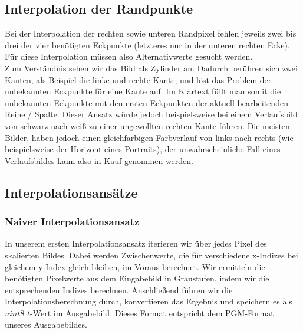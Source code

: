 \documentclass[course=erap]{aspdoc}
\begin{document}
\subsection{Interpolation der Randpunkte}
Bei der Interpolation der rechten sowie unteren Randpixel fehlen jeweils zwei bis drei der vier benötigten Eckpunkte (letzteres nur in der unteren rechten Ecke). Für diese Interpolation müssen also Alternativwerte gesucht werden.\\
Zum Verständnis sehen wir das Bild als Zylinder an. Dadurch berühren sich zwei Kanten, als Beispiel die linke und rechte Kante, und löst das Problem der unbekannten Eckpunkte für eine Kante auf. Im Klartext füllt man somit die unbekannten Eckpunkte mit den ersten Eckpunkten der aktuell bearbeitenden Reihe / Spalte. Dieser Ansatz würde jedoch beispielsweise bei einem Verlaufsbild von schwarz nach weiß zu einer ungewollten rechten Kante führen. Die meisten Bilder, haben jedoch einen gleichfarbigen Farbverlauf von links nach rechts (wie beispielsweise der Horizont eines Portraits), der unwahrscheinliche Fall eines Verlaufsbildes kann also in Kauf genommen werden.


\subsection{Interpolationsansätze}

\subsubsection{Naiver Interpolationsansatz}
In unserem ersten Interpolationsansatz iterieren wir über jedes Pixel des skalierten Bildes. Dabei werden Zwischenwerte, die für verschiedene x-Indizes bei gleichem y-Index gleich bleiben, im Voraus berechnet. Wir ermitteln die benötigten Pixelwerte aus dem Eingabebild in Graustufen, indem wir die entsprechenden Indizes berechnen. Anschließend führen wir die Interpolationsberechnung durch, konvertieren das Ergebnis und speichern es als $uint8\_t$-Wert im Ausgabebild. Dieses Format entspricht dem PGM-Format unseres Ausgabebildes.
\end{document}
